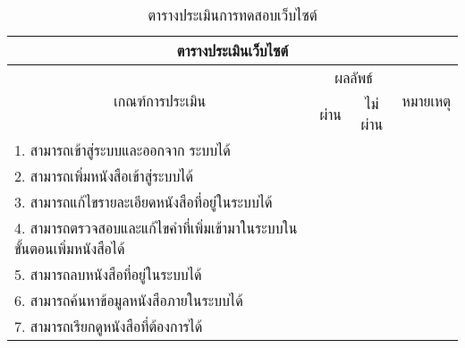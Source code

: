 \begin{table}[H]
\caption{ตารางประเมินการทดสอบเว็บไซต์}\label{tbl:test}
\begin{tabular}{|l|l|l|l|}
\hline
\multicolumn{4}{|c|}{ตารางประเมินเว็บไซต์}                                                                                                                                             \\ \hline
\multicolumn{1}{|c|}{\multirow{2}{*}{เกณฑ์การประเมิน}}                  & \multicolumn{2}{c|}{ผลลัพธ์}                             & \multicolumn{1}{c|}{\multirow{2}{*}{หมายเหตุ}} \\ \cline{2-3}
\multicolumn{1}{|c|}{}                                                  & \multicolumn{1}{c|}{ผ่าน} & \multicolumn{1}{c|}{ไม่ผ่าน} & \multicolumn{1}{c|}{}                          \\ \hline
1. สามารถเข้าสู่ระบบและออกจาก ระบบได้                                   &                           &                              &                                                \\ \hline
2. สามารถเพิ่มหนังสือเข้าสู่ระบบได้                                      &                           &                              &                                                \\ \hline
3. สามารถแก้ไขรายละเอียดหนังสือที่อยู่ในระบบได้                          &                           &                              &                                                \\ \hline
4.   สามารถตรวจสอบและแก้ไขคำที่เพิ่มเข้ามาในระบบในขั้นตอนเพิ่มหนังสือได้ &                           &                              &                                                \\ \hline
5. สามารถลบหนังสือที่อยู่ในระบบได้                                       &                           &                              &                                                \\ \hline
6.   สามารถค้นหาข้อมูลหนังสือภายในระบบได้                                &                           &                              &                                                \\ \hline
7.   สามารถเรียกดูหนังสือที่ต้องการได้                                   &                           &                              &                                                \\ \hline
\end{tabular}
\end{table}